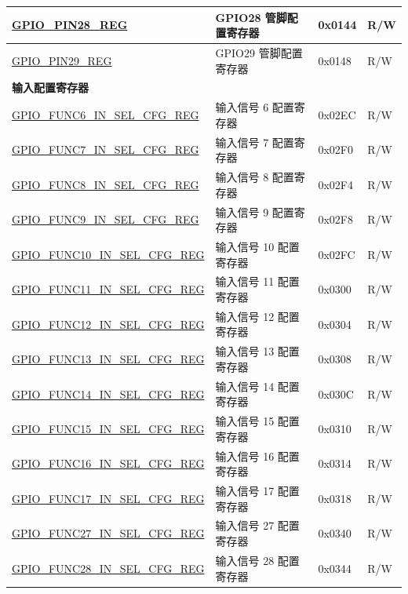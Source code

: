 \begin{longtable}{ | p{6cm} | p{7.2cm} | p{1.3cm} | p{1cm} | }
\hyperref[regdesc:GPIOPINNREG]{GPIO\_PIN28\_REG} & GPIO28 管脚配置寄存器 & 0x0144 & R/W \\ \hline
\hyperref[regdesc:GPIOPINNREG]{GPIO\_PIN29\_REG} & GPIO29 管脚配置寄存器 & 0x0148 & R/W \\ \hline
\multicolumn{4}{|l|}{\textbf{输入配置寄存器}} \\ \hline
\hyperref[regdesc:GPIOFUNCMINSELCFGREG]{GPIO\_FUNC6\_IN\_SEL\_CFG\_REG} & 输入信号 6 配置寄存器 & 0x02EC & R/W \\ \hline
\hyperref[regdesc:GPIOFUNCMINSELCFGREG]{GPIO\_FUNC7\_IN\_SEL\_CFG\_REG} & 输入信号 7 配置寄存器 & 0x02F0 & R/W \\ \hline
\hyperref[regdesc:GPIOFUNCMINSELCFGREG]{GPIO\_FUNC8\_IN\_SEL\_CFG\_REG} & 输入信号 8 配置寄存器 & 0x02F4 & R/W \\ \hline
\hyperref[regdesc:GPIOFUNCMINSELCFGREG]{GPIO\_FUNC9\_IN\_SEL\_CFG\_REG} & 输入信号 9 配置寄存器 & 0x02F8 & R/W \\ \hline
\hyperref[regdesc:GPIOFUNCMINSELCFGREG]{GPIO\_FUNC10\_IN\_SEL\_CFG\_REG} & 输入信号 10 配置寄存器 & 0x02FC & R/W \\ \hline
\hyperref[regdesc:GPIOFUNCMINSELCFGREG]{GPIO\_FUNC11\_IN\_SEL\_CFG\_REG} & 输入信号 11 配置寄存器 & 0x0300 & R/W \\ \hline
\hyperref[regdesc:GPIOFUNCMINSELCFGREG]{GPIO\_FUNC12\_IN\_SEL\_CFG\_REG} & 输入信号 12 配置寄存器 & 0x0304 & R/W \\ \hline
\hyperref[regdesc:GPIOFUNCMINSELCFGREG]{GPIO\_FUNC13\_IN\_SEL\_CFG\_REG} & 输入信号 13 配置寄存器 & 0x0308 & R/W \\ \hline
\hyperref[regdesc:GPIOFUNCMINSELCFGREG]{GPIO\_FUNC14\_IN\_SEL\_CFG\_REG} & 输入信号 14 配置寄存器 & 0x030C & R/W \\ \hline
\hyperref[regdesc:GPIOFUNCMINSELCFGREG]{GPIO\_FUNC15\_IN\_SEL\_CFG\_REG} & 输入信号 15 配置寄存器 & 0x0310 & R/W \\ \hline
\hyperref[regdesc:GPIOFUNCMINSELCFGREG]{GPIO\_FUNC16\_IN\_SEL\_CFG\_REG} & 输入信号 16 配置寄存器 & 0x0314 & R/W \\ \hline
\hyperref[regdesc:GPIOFUNCMINSELCFGREG]{GPIO\_FUNC17\_IN\_SEL\_CFG\_REG} & 输入信号 17 配置寄存器 & 0x0318 & R/W \\ \hline
\hyperref[regdesc:GPIOFUNCPINSELCFGREG]{GPIO\_FUNC27\_IN\_SEL\_CFG\_REG} & 输入信号 27 配置寄存器 & 0x0340 & R/W \\ \hline
\hyperref[regdesc:GPIOFUNCPINSELCFGREG]{GPIO\_FUNC28\_IN\_SEL\_CFG\_REG} & 输入信号 28 配置寄存器 & 0x0344 & R/W \\ \hline

\end{longtable}

